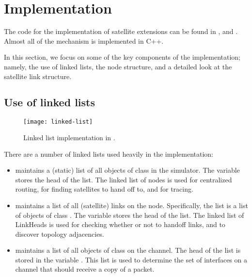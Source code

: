 
\section{Implementation}
\label{sec:satellite/implementation}

The code for the implementation of satellite extensions can be found
in , and
.  Almost all of the mechanism is implemented
in C++.

In this section, we focus on some of the key components of the implementation;
namely, the use of linked lists, the node structure, and a detailed look
at the satellite link structure.

\subsection{Use of linked lists}
\label{sec:satellite/implementation/list}

\begin{figure}
    \centerline{\texttt{[image: linked-list]}}
    \caption{Linked list implementation in \ns.}
    \label{fig:linked-list}
\end{figure}

There are a number of linked lists used heavily in the implementation:
\begin{itemize}

\item {} maintains a (static) list of all objects of class
 in the simulator.  The variable  stores
the head of the list.  The linked list of nodes is used for centralized
routing, for finding satellites to hand off to, and for tracing.

\item {} maintains a list of all (satellite) links on the
node.  Specifically, the list is a list of objects of class . 
The variable  stores the head of the list.  The
linked list of LinkHeads is used for checking whether or not to handoff
links, and to discover topology adjacencies.

\item {} maintains a list of all objects of class
 on the channel.  The head of the list is stored in the variable
.  This list is used to determine the set of interfaces on a
channel that should receive a copy of a packet.
\end{itemize}

